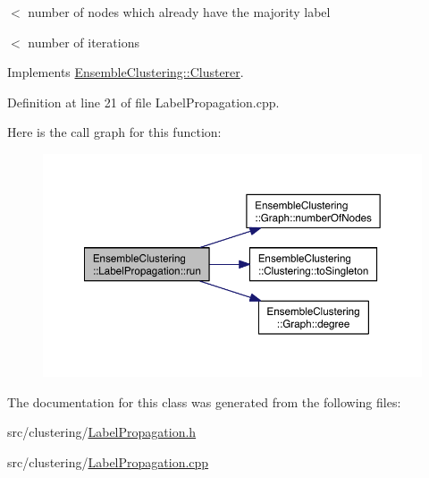 $<$ number of nodes which already have the majority label

$<$ number of iterations 

Implements \hyperlink{class_ensemble_clustering_1_1_clusterer_a4266e5bb967201f6567ce299bbc2f662}{Ensemble\-Clustering\-::\-Clusterer}.



Definition at line 21 of file Label\-Propagation.\-cpp.



Here is the call graph for this function\-:\nopagebreak
\begin{figure}[H]
\begin{center}
\leavevmode
\includegraphics[width=350pt]{class_ensemble_clustering_1_1_label_propagation_a4915a00c1a2dc5a07c7d902bcb66f52a_cgraph}
\end{center}
\end{figure}




The documentation for this class was generated from the following files\-:\begin{DoxyCompactItemize}
\item 
src/clustering/\hyperlink{_label_propagation_8h}{Label\-Propagation.\-h}\item 
src/clustering/\hyperlink{_label_propagation_8cpp}{Label\-Propagation.\-cpp}\end{DoxyCompactItemize}
